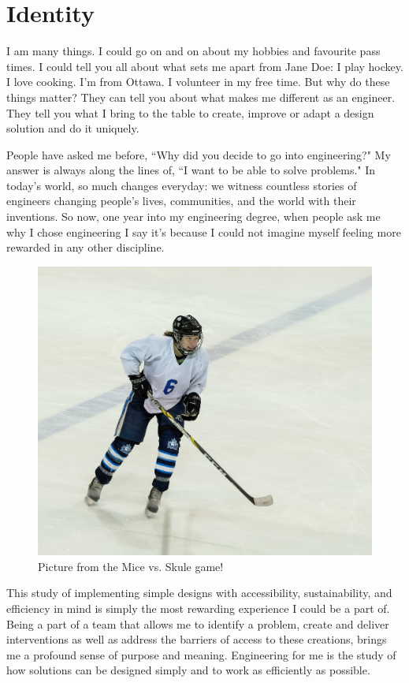 \documentclass[paper=a4, fontsize=11pt]{article} %
\begin{document}
\maketitle
\newpage
\tableofcontents
\newpage


\section{Identity}
I am many things. I could go on and on about my hobbies and favourite pass times. I could tell you all about what sets me apart from Jane Doe: I play hockey. I love cooking. I'm from Ottawa. I volunteer in my free time. But why do these things matter? They can tell you about what makes me different as an engineer. They tell you what I bring to the table to create, improve or adapt a design solution and do it uniquely.

People have asked me before, ``Why did you decide to go into engineering?" My answer is always along the lines of, ``I want to be able to solve problems." In today's world, so much changes everyday: we witness countless stories of engineers changing people's lives, communities, and the world with their inventions.  So now, one year into my engineering degree, when people ask me why I chose engineering I say it’s because I could not imagine myself feeling more rewarded in any other discipline.

\begin{figure}[H]
    \centering
    \includegraphics[width=0.7\linewidth]{hockey.jpg}
    \caption{Picture from the Mice vs. Skule game!}
\end{figure}

This study of implementing simple designs with accessibility, sustainability, and efficiency in mind is simply the most rewarding experience I could be a part of.  Being a part of a team that allows me to identify a problem, create and deliver interventions as well as address the barriers of access to these creations, brings me a profound sense of purpose and meaning. Engineering for me is the study of how solutions can be designed simply and to work as efficiently as possible.
\end{document}
